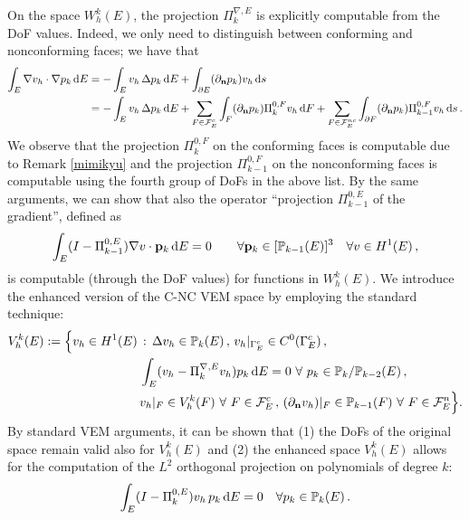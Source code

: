 \documentclass[a4paper,11pt]{article}
\theoremstyle{remark}
\theoremstyle{definition}
\newcommand{\Pol}{\mathbb{P}}
\newcommand{\PiNablaE}{\Pi^{\nabla,E}_k}
\newcommand{\PiZeroE}{\Pi^{0,E}_k}
\newcommand{\PiZeroF}{\Pi^{0,F}_k}
\begin{document}
On the space $W_h^k(E)$, the projection $\PiNablaE$ is explicitly computable from the DoF values. Indeed, we only need to distinguish between conforming and nonconforming faces; we have that
\begin{equation}\label{eq:squirtle}
\begin{aligned}
\int_E \nabla v_h \cdot \nabla p_k \, {\rm d}E 
&= 
-\int_E v_h \, \Delta p_k \, {\rm d}E
+ 
\int_{\partial E} (\partial_\mathbf{n} p_k) v_h \, {\rm d}s
\\
&
= -\int_E v_h \, \Delta p_k \, {\rm d}E
+ 
\sum_{F \in {\cal F}_E^c}
\int_{F} (\partial_\mathbf{n} p_k) \PiZeroF v_h \, {\rm d}F
+ 
\sum_{F \in {\cal F}_E^{nc}}
\int_{\partial F} (\partial_\mathbf{n} p_k) \Pi^{0,F}_{k-1} v_h \, {\rm d}s \, .
\end{aligned}
\end{equation}
We observe that the projection $\PiZeroF$ on the conforming faces is computable due to Remark \ref{mimikyu} and the projection $\Pi^{0,F}_{k-1}$ on the nonconforming faces is computable using the fourth group of DoFs in the above list.
By the same arguments, we can show that also the operator ``projection $\Pi^{0,E}_{k-1}$ of the gradient'', defined as
\begin{equation}\label{eq:pizerograd}
\int_E (I - \Pi^{0,E}_{k-1})\nabla v \cdot \mathbf p_k \, {\rm d}E 
= 
0 \qquad \forall \mathbf p_k \in [\mathbb{P}_{k-1}(E)]^{3} \quad \forall v \in H^1(E) \, ,
\end{equation}
is computable (through the DoF values) for functions in $W_h^k(E)$.
We introduce the enhanced version of the C-NC VEM space by employing the standard technique:
\begin{equation}\label{pokeball}
\begin{aligned}
V_h^k(E) := \Big\{ v_h \in H^1(E)\, & :\, \Delta v_h \in \Pol_{k}(E) \, , \, 
v_h|_{\Gamma^{c}_E} \in C^0(\Gamma^{c}_E) \, , \\
& \int_E (v_h-\PiNablaE v_h) p_k \,{\rm d}E = 0 \ \forall \ p_k \in \Pol_k/\Pol_{k-2}(E) \, , \\
&v_h|_F \in V_h^k(F) \ \forall \ F \in {\cal F}^c_E \, , \,
(\partial_{{\bf n}} v_h)|_F \in \Pol_{k-1}(F) \ \forall \ F \in {\cal F}^n_E  \Big\} .
\end{aligned}
\end{equation}
By standard VEM arguments, it can be shown that (1) the DoFs of the original space remain valid also for $V_h^k(E)$ and (2) the enhanced space $V_h^k(E)$ allows for the computation of the $L^2$ orthogonal projection on polynomials of degree $k$:
\begin{equation}
\int_E (I - \PiZeroE) v_h \, p_k \, {\rm d} E = 0 \quad \forall p_k \in \mathbb{P}_k(E) \, .
\label{eqn:scalPiZero}
\end{equation}
\end{document}

